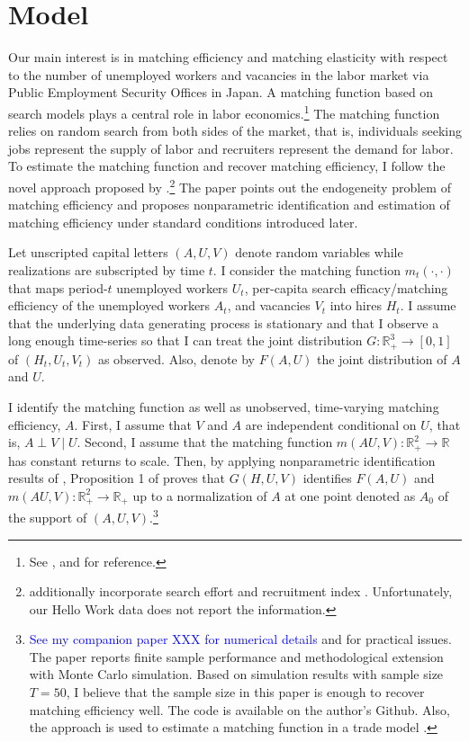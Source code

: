 \documentclass[12pt]{article}
\begin{document}
\section{Model}
Our main interest is in matching efficiency and matching elasticity with respect to the number of unemployed workers and vacancies in the labor market via Public Employment Security Offices in Japan.
A matching function based on search models plays a central role in labor economics.\footnote{See \cite{pissarides2000equilibrium,petrongolo2001looking}, and \cite{rogerson2005search} for reference.} 
The matching function relies on random search from both sides of the market, that is, individuals seeking jobs represent the supply of labor and recruiters represent the demand for labor.
To estimate the matching function and recover matching efficiency, I follow the novel approach proposed by \cite{lange2020beyond}.\footnote{\cite{lange2020beyond} additionally incorporate search effort \citep{mukoyama2018job} and recruitment index \citep{davis2013establishment}. Unfortunately, our Hello Work data does not report the information.}
The paper points out the endogeneity problem of matching efficiency \citep{borowczyk2013accounting} and proposes nonparametric identification and estimation of matching efficiency under standard conditions introduced later.

Let unscripted capital letters $(A, U, V)$ denote random variables while realizations are subscripted by time $t$. 
I consider the matching function $m_t(\cdot,\cdot)$ that maps period-$t$ unemployed workers $U_t$, per-capita search efficacy/matching efficiency of the unemployed workers $A_t$, and vacancies $V_t$ into hires $H_t$.
I assume that the underlying data generating process is stationary and that I observe a long enough time-series so that I can treat the joint distribution $G: \mathbb{R}_{+}^3 \rightarrow[0,1]$ of $\left(H_t, U_t, V_t\right)$ as observed. 
Also, denote by $F(A, U)$ the joint distribution of $A$ and $U$.

I identify the matching function as well as unobserved, time-varying matching efficiency, $A .$ 
First, I assume that $V$ and $A$ are independent conditional on $U$, that is, $A \perp V \mid U$. 
Second, I assume that the matching function $m(AU,V):\mathbb{R}_{+}^2 \rightarrow \mathbb{R}$ has constant returns to scale. 
Then, by applying nonparametric identification results of \cite{matzkin2003nonparametric}, Proposition 1 of \cite{lange2020beyond} proves that $G(H, U, V)$ identifies $F(A, U)$ and $m(A U, V): \mathbb{R}_{+}^2 \rightarrow \mathbb{R}_{+}$ up to a normalization of $A$ at one point denoted as $A_0$ of the support of $(A, U, V)$.\footnote{\textcolor{blue}{See my companion paper XXX for numerical details} and \cite{brancaccio2020guide} for practical issues. The paper reports finite sample performance and methodological extension with Monte Carlo simulation. Based on simulation results with sample size $T=50$, I believe that the sample size in this paper is enough to recover matching efficiency well. The code is available on the author's Github. Also, the approach is used to estimate a matching function in a trade model \citep{brancaccio2020geography,brancaccio2023search}.}
\end{document}
